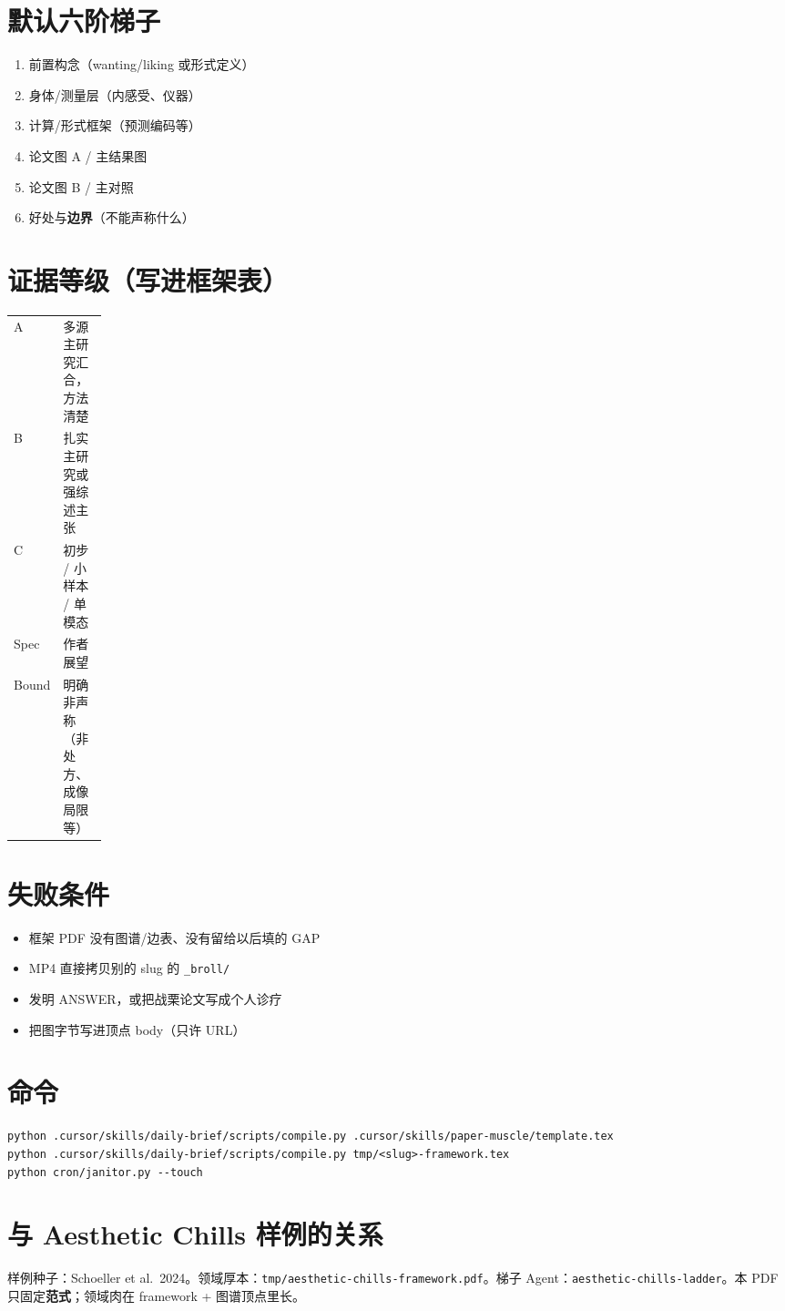 \documentclass[11pt,a4paper]{ctexart}
\begin{document}
\section{默认六阶梯子}

\begin{enumerate}
  \item 前置构念（wanting/liking 或形式定义）
  \item 身体/测量层（内感受、仪器）
  \item 计算/形式框架（预测编码等）
  \item 论文图 A / 主结果图
  \item 论文图 B / 主对照
  \item 好处与\textbf{边界}（不能声称什么）
\end{enumerate}

\section{证据等级（写进框架表）}

{\footnotesize
\begin{tabularx}{\linewidth}{@{}p{0.12\linewidth} X@{}}
\toprule
A & 多源主研究汇合，方法清楚 \\
B & 扎实主研究或强综述主张 \\
C & 初步 / 小样本 / 单模态 \\
Spec & 作者展望 \\
Bound & 明确非声称（非处方、成像局限等） \\
\bottomrule
\end{tabularx}}

\section{失败条件}

\begin{itemize}
  \item 框架 PDF 没有图谱/边表、没有留给以后填的 GAP
  \item MP4 直接拷贝别的 slug 的 \texttt{\_broll/}
  \item 发明 ANSWER，或把战栗论文写成个人诊疗
  \item 把图字节写进顶点 body（只许 URL）
\end{itemize}

\section{命令}

\begin{verbatim}
python .cursor/skills/daily-brief/scripts/compile.py .cursor/skills/paper-muscle/template.tex
python .cursor/skills/daily-brief/scripts/compile.py tmp/<slug>-framework.tex
python cron/janitor.py --touch
\end{verbatim}

\section{与 Aesthetic Chills 样例的关系}

样例种子：Schoeller et al.\ 2024。领域厚本：\texttt{tmp/aesthetic-chills-framework.pdf}。梯子 Agent：\texttt{aesthetic-chills-ladder}。本 PDF 只固定\textbf{范式}；领域肉在 framework + 图谱顶点里长。
\end{document}
